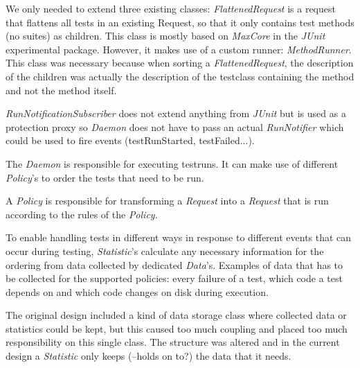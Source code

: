 \documentclass[i2]{oss}
\newcommand{\class}[1]{\emph{#1}}
\newcommand{\junit}{\emph{JUnit }}
\begin{document}
We only needed to extend three existing classes: \class{FlattenedRequest}
is a request that flattens all tests in an existing Request, so that it only contains test methods (no suites) as children. 
This class is mostly based on \class{MaxCore} in the \junit experimental package. 
However, it makes use of a custom runner: \class{MethodRunner}. 
This class was necessary because when sorting a \class{FlattenedRequest}, the description of the children was actually the
description of the testclass containing the method and not the method 
itself.

\class{RunNotificationSubscriber} does not extend anything from 
\junit but is used as a protection proxy so \class{Daemon} does not have 
to pass an actual \class{RunNotifier} which could be used to fire events 
(testRunStarted, testFailed...). 

The \class{Daemon} is responsible for executing testruns.
It can make use of different \class{Policy}'s to order the tests that 
need to be run. 

A \class{Policy} is responsible for transforming a \class{Request} into a \class{Request} that is run according to the rules of the \class{Policy}. 

To enable handling tests in different ways in response to different 
events that can occur during testing, \class{Statistic}'s calculate any 
necessary information for the ordering from data collected by dedicated 
\class{Data}'s. %
Examples of data that has to be collected for the supported policies: 
every failure of a test, which code a test depends on and which code 
changes on disk during execution.

The original design included a kind of data storage class where collected
data or statistics could be kept, but this caused too much coupling
and placed too much responsibility on this single class.
The structure was altered and in the current design a \class{Statistic}
only keeps (--holds on to?) the data that it needs.
\end{document}
